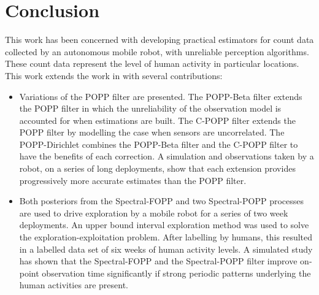 \section{Conclusion}
\label{sec:conclusion}

This work has been concerned with developing practical estimators for count data collected by an autonomous mobile robot, with unreliable perception algorithms. These count data represent the level of human activity in particular locations. This work extends the work in \cite{jovan18a} with several contributions:

\begin{itemize} 
    \item Variations of the POPP filter are presented. The POPP-Beta filter extends the POPP filter in which the unreliability of the observation model is accounted for when estimations are built. The C-POPP filter extends the POPP filter by modelling the case when sensors are uncorrelated. The POPP-Dirichlet combines the POPP-Beta filter and the C-POPP filter to have the benefits of each correction. A simulation and observations taken by a robot, on a series of long deployments, show that each extension provides progressively more accurate estimates than the POPP filter.  
    \item Both posteriors from the Spectral-FOPP and two Spectral-POPP processes are used to drive exploration by a mobile robot for a series of two week deployments. An upper bound interval exploration method was used to solve the exploration-exploitation problem. After labelling by humans, this resulted in a labelled data set of six weeks of human activity levels. A simulated study has shown that the Spectral-FOPP and the Spectral-POPP filter improve on-point observation time significantly if strong periodic patterns underlying the human activities are present. 
\end{itemize}
        
